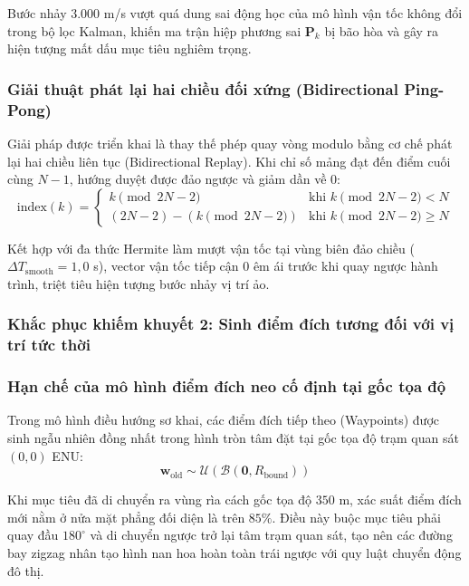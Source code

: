 Bước nhảy $3.000$ m/s vượt quá dung sai động học của mô hình vận tốc không đổi trong bộ lọc Kalman, khiến ma trận hiệp phương sai $\mathbf{P}_k$ bị bão hòa và gây ra hiện tượng mất dấu mục tiêu nghiêm trọng.

\subsubsection{Giải thuật phát lại hai chiều đối xứng (Bidirectional Ping-Pong)}

\hspace{0.5cm} Giải pháp được triển khai là thay thế phép quay vòng modulo bằng cơ chế phát lại hai chiều liên tục (Bidirectional Replay). Khi chỉ số mảng đạt đến điểm cuối cùng $N-1$, hướng duyệt được đảo ngược và giảm dần về 0:
\begin{equation}
\text{index}(k) = \begin{cases}
k \pmod{2N - 2} & \text{khi } k \pmod{2N - 2} < N \\
(2N - 2) - (k \pmod{2N - 2}) & \text{khi } k \pmod{2N - 2} \ge N
\end{cases}
\label{eq:pingpong-indexing-formula}
\end{equation}

Kết hợp với đa thức Hermite làm mượt vận tốc tại vùng biên đảo chiều ($\Delta T_{\text{smooth}} = 1{,}0$ s), vector vận tốc tiếp cận 0 êm ái trước khi quay ngược hành trình, triệt tiêu hiện tượng bước nhảy vị trí ảo.

\subsubsection{Khắc phục khiếm khuyết 2: Sinh điểm đích tương đối với vị trí tức thời}

\subsubsection{Hạn chế của mô hình điểm đích neo cố định tại gốc tọa độ}

\hspace{0.5cm} Trong mô hình điều hướng sơ khai, các điểm đích tiếp theo (Waypoints) được sinh ngẫu nhiên đồng nhất trong hình tròn tâm đặt tại gốc tọa độ trạm quan sát $(0, 0)$ ENU:
\begin{equation}
\mathbf{w}_{\text{old}} \sim \mathcal{U}(\mathcal{B}(\mathbf{0}, R_{\text{bound}}))
\label{eq:origin-anchored-waypoint}
\end{equation}

Khi mục tiêu đã di chuyển ra vùng rìa cách gốc tọa độ $350$ m, xác suất điểm đích mới nằm ở nửa mặt phẳng đối diện là trên $85\%$. Điều này buộc mục tiêu phải quay đầu $180^\circ$ và di chuyển ngược trở lại tâm trạm quan sát, tạo nên các đường bay zigzag nhân tạo hình nan hoa hoàn toàn trái ngược với quy luật chuyển động đô thị.

